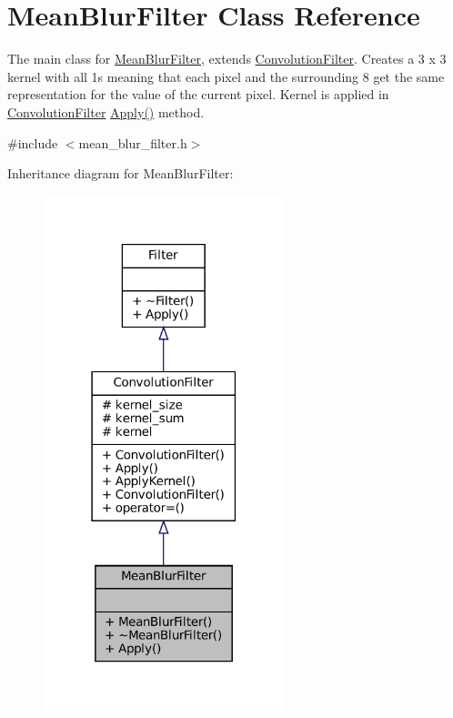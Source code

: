 \hypertarget{classMeanBlurFilter}{}\section{Mean\+Blur\+Filter Class Reference}
\label{classMeanBlurFilter}


The main class for \hyperlink{classMeanBlurFilter}{Mean\+Blur\+Filter}, extends \hyperlink{classConvolutionFilter}{Convolution\+Filter}. Creates a 3 x 3 kernel with all 1\textquotesingle{}s meaning that each pixel and the surrounding 8 get the same representation for the value of the current pixel. Kernel is applied in \hyperlink{classConvolutionFilter}{Convolution\+Filter} \hyperlink{classMeanBlurFilter_abb7824005c70b04aca6a24760f85cbc1}{Apply()} method.  




{\ttfamily \#include $<$mean\+\_\+blur\+\_\+filter.\+h$>$}



Inheritance diagram for Mean\+Blur\+Filter\+:\nopagebreak
\begin{figure}[H]
\begin{center}
\leavevmode
\includegraphics[width=198pt]{classMeanBlurFilter__inherit__graph}
\end{center}
\end{figure}


